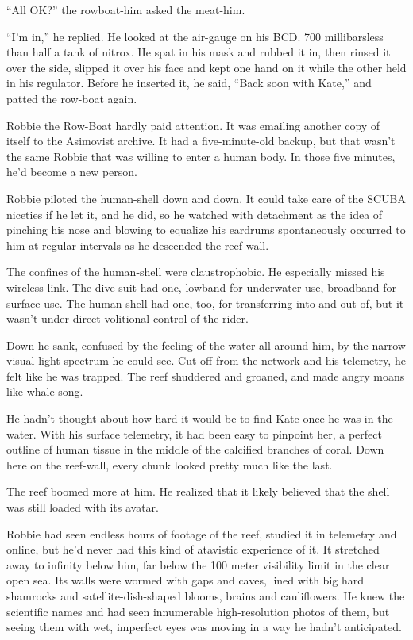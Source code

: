“All OK?” the rowboat-him asked the meat-him.

“I’m in,” he replied. He looked at the air-gauge on his BCD. 700
millibars\dash{}less than half a tank of nitrox. He spat in his mask and
rubbed it in, then rinsed it over the side, slipped it over his
face and kept one hand on it while the other held in his regulator.
Before he inserted it, he said, “Back soon with Kate,” and patted
the row-boat again.

Robbie the Row-Boat hardly paid attention. It was emailing another
copy of itself to the Asimovist archive. It had a five-minute-old
backup, but that wasn’t the same Robbie that was willing to enter a
human body. In those five minutes, he’d become a new person.

\tb

Robbie piloted the human-shell down and down. It could take care of
the SCUBA niceties if he let it, and he did, so he watched with
detachment as the idea of pinching his nose and blowing to equalize
his eardrums spontaneously occurred to him at regular intervals as
he descended the reef wall.

The confines of the human-shell were claustrophobic. He especially
missed his wireless link. The dive-suit had one, lowband for
underwater use, broadband for surface use. The human-shell had one,
too, for transferring into and out of, but it wasn’t under direct
volitional control of the rider.

Down he sank, confused by the feeling of the water all around him,
by the narrow visual light spectrum he could see. Cut off from the
network and his telemetry, he felt like he was trapped. The reef
shuddered and groaned, and made angry moans like whale-song.

He hadn’t thought about how hard it would be to find Kate once he
was in the water. With his surface telemetry, it had been easy to
pinpoint her, a perfect outline of human tissue in the middle of
the calcified branches of coral. Down here on the reef-wall, every
chunk looked pretty much like the last.

The reef boomed more at him. He realized that it likely believed
that the shell was still loaded with its avatar.

Robbie had seen endless hours of footage of the reef, studied it in
telemetry and online, but he’d never had this kind of atavistic
experience of it. It stretched away to infinity below him, far
below the 100 meter visibility limit in the clear open sea. Its
walls were wormed with gaps and caves, lined with big hard
shamrocks and satellite-dish-shaped blooms, brains and
cauliflowers. He knew the scientific names and had seen innumerable
high-resolution photos of them, but seeing them with wet, imperfect
eyes was moving in a way he hadn’t anticipated.

